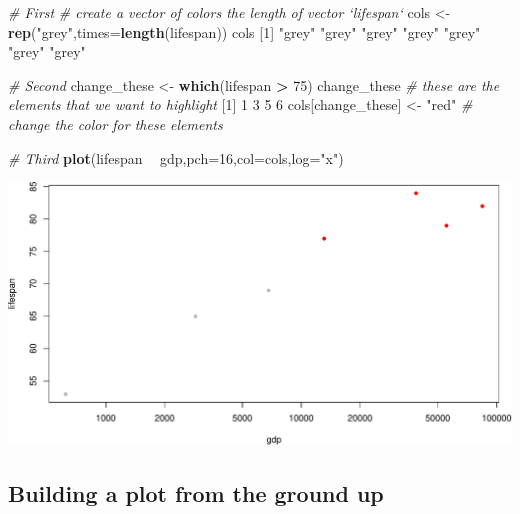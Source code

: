 \documentclass[
]{book}
\newenvironment{Shaded}{\begin{snugshade}}{\end{snugshade}}
\newcommand{\CommentTok}[1]{\textcolor[rgb]{0.56,0.35,0.01}{\textit{#1}}}
\newcommand{\DataTypeTok}[1]{\textcolor[rgb]{0.13,0.29,0.53}{#1}}
\newcommand{\DecValTok}[1]{\textcolor[rgb]{0.00,0.00,0.81}{#1}}
\newcommand{\KeywordTok}[1]{\textcolor[rgb]{0.13,0.29,0.53}{\textbf{#1}}}
\newcommand{\NormalTok}[1]{#1}
\newcommand{\OperatorTok}[1]{\textcolor[rgb]{0.81,0.36,0.00}{\textbf{#1}}}
\newcommand{\StringTok}[1]{\textcolor[rgb]{0.31,0.60,0.02}{#1}}
\begin{document}
\begin{Shaded}
\begin{Highlighting}[]
\CommentTok{# First}
\CommentTok{# create a vector of colors the length of vector `lifespan`}
\NormalTok{cols <-}\StringTok{ }\KeywordTok{rep}\NormalTok{(}\StringTok{"grey"}\NormalTok{,}\DataTypeTok{times=}\KeywordTok{length}\NormalTok{(lifespan)) }
\NormalTok{cols}
\NormalTok{[}\DecValTok{1}\NormalTok{] }\StringTok{"grey"} \StringTok{"grey"} \StringTok{"grey"} \StringTok{"grey"} \StringTok{"grey"} \StringTok{"grey"} \StringTok{"grey"}

\CommentTok{# Second}
\NormalTok{change_these <-}\StringTok{ }\KeywordTok{which}\NormalTok{(lifespan }\OperatorTok{>}\StringTok{ }\DecValTok{75}\NormalTok{) }
\NormalTok{change_these }\CommentTok{# these are the elements that we want to highlight}
\NormalTok{[}\DecValTok{1}\NormalTok{] }\DecValTok{1} \DecValTok{3} \DecValTok{5} \DecValTok{6}
\NormalTok{cols[change_these] <-}\StringTok{ "red"}  \CommentTok{# change the color for these elements }

\CommentTok{# Third}
\KeywordTok{plot}\NormalTok{(lifespan }\OperatorTok{~}\StringTok{ }\NormalTok{gdp,}\DataTypeTok{pch=}\DecValTok{16}\NormalTok{,}\DataTypeTok{col=}\NormalTok{cols,}\DataTypeTok{log=}\StringTok{"x"}\NormalTok{)}
\end{Highlighting}
\end{Shaded}

\includegraphics{figures/unnamed-chunk-549-1.pdf}

\hypertarget{building-a-plot-from-the-ground-up}{%
\subsection*{Building a plot from the ground up}\label{building-a-plot-from-the-ground-up}}
\end{document}
